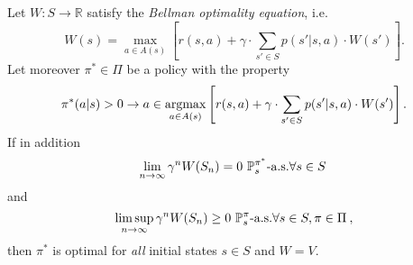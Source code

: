 \begin{theorem}
Let \( W: S \to \mathbb{R}  \) satisfy the \emph{Bellman optimality equation},
i.e. 
\[
    W(s) = \max_{a \in A(s)} \left[ r(s,a) + \gamma \cdot \sum_{s' \in S} p(s'|s,a) \cdot W(s') \right].
\]
Let moreover \( \pi^* \in \Pi \) be a policy with the property
\[
    \pi^*(a|s) > 0 \rightarrow a \in \operatorname*{argmax}_{a \in A(s)} \left[ r(s,a) + \gamma \cdot \sum_{s' \in S} p(s' | s,a) \cdot W(s') \right].
\]
If in addition 
\[
    \lim_{n \to \infty} \gamma^n W(S_n) = 0 \,\, \mathbb{P}_s^{\pi^*}\text{-a.s.} \forall s \in S\:
\]
and 
\[
    \limsup_{n \to \infty} \gamma^n W(S_n) \geq 0 \,\, \mathbb{P}_s^\pi\text{-a.s.} \forall s \in S, \pi \in \Pi\:, \]
    then \( \pi^* \) is optimal for \textit{all} initial states \( s \in S \) and \( W = V \).   
\end{theorem}
